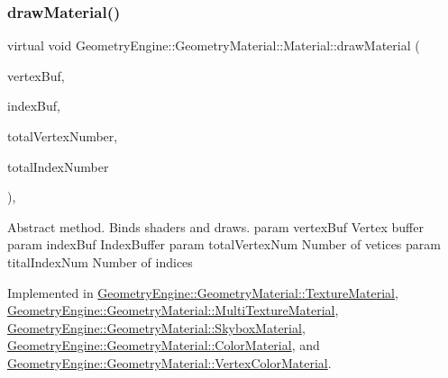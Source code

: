 \subsubsection{\texorpdfstring{drawMaterial()}{drawMaterial()}}
{\footnotesize\ttfamily virtual void Geometry\+Engine\+::\+Geometry\+Material\+::\+Material\+::draw\+Material (\begin{DoxyParamCaption}\item[{Q\+Open\+G\+L\+Buffer $\ast$}]{vertex\+Buf,  }\item[{Q\+Open\+G\+L\+Buffer $\ast$}]{index\+Buf,  }\item[{unsigned int}]{total\+Vertex\+Number,  }\item[{unsigned int}]{total\+Index\+Number }\end{DoxyParamCaption})\hspace{0.3cm}{\ttfamily [protected]}, {}}

Abstract method. Binds shaders and draws. param vertex\+Buf Vertex buffer param index\+Buf Index\+Buffer param total\+Vertex\+Num Number of vetices param tital\+Index\+Num Number of indices 

Implemented in \mbox{\hyperlink{class_geometry_engine_1_1_geometry_material_1_1_texture_material_a7bb3c956fa64e47b251d882890c931f9}{Geometry\+Engine\+::\+Geometry\+Material\+::\+Texture\+Material}}, \mbox{\hyperlink{class_geometry_engine_1_1_geometry_material_1_1_multi_texture_material_af6edaa5960d07b6abee870760e869189}{Geometry\+Engine\+::\+Geometry\+Material\+::\+Multi\+Texture\+Material}}, \mbox{\hyperlink{class_geometry_engine_1_1_geometry_material_1_1_skybox_material_a0cc520b905996a178c80a2657bc9746f}{Geometry\+Engine\+::\+Geometry\+Material\+::\+Skybox\+Material}}, \mbox{\hyperlink{class_geometry_engine_1_1_geometry_material_1_1_color_material_abaf6f7ed79dad79253ea469c4c7460eb}{Geometry\+Engine\+::\+Geometry\+Material\+::\+Color\+Material}}, and \mbox{\hyperlink{class_geometry_engine_1_1_geometry_material_1_1_vertex_color_material_af03191da84c84c45af91405f3cba3b5d}{Geometry\+Engine\+::\+Geometry\+Material\+::\+Vertex\+Color\+Material}}.

\mbox{\label{class_geometry_engine_1_1_geometry_material_1_1_material_a68310797df53062f237d0005fbcfce7e}} 
